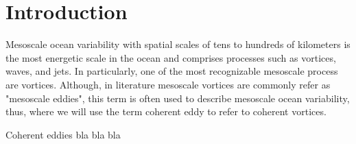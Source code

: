 \documentclass[draft,linenumbers]{agujournal2019}
\newcommand{\KE}{\textrm{KE}}
\begin{document}
	
\section{Introduction}

Mesoscale ocean variability with spatial scales of tens to hundreds of kilometers is the most energetic scale in the ocean and comprises processes such as vortices, waves, and jets. In particularly, one of the most recognizable mesoscale process are vortices. Although, in literature mesoscale vortices are commonly refer as "mesoscale eddies", this term is often used to describe mesoscale ocean variability, thus, where we will use the term coherent eddy to refer to coherent vortices. 

Coherent eddies bla bla bla











\end{document}
